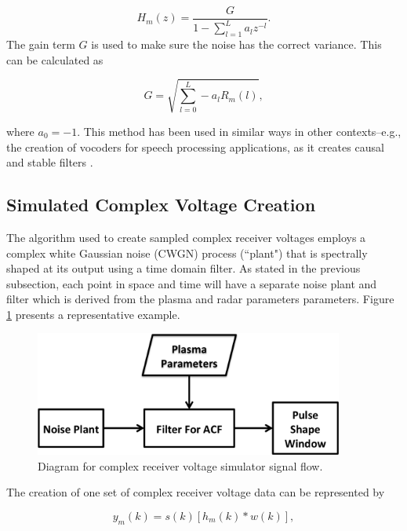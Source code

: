 \begin{equation}
\label{eq:filtz}
H_m(z) = \frac{G}{1-\displaystyle \sum_{l=1}^{L} a_l z^{-l}}.
\end{equation}
\noindent The gain term $G$ is used to make sure the noise has the correct variance. This can be calculated as 

\begin{equation}
\label{eq:gainterm}
G=\sqrt{\displaystyle \sum_{l=0}^L -a_l R_m(l)},
\end{equation}

\noindent where $a_0=-1$. This method has been used in similar ways in other contexts--e.g., the creation of vocoders for speech processing applications, as it creates causal and stable filters \cite{rabinerdigitalspeech}.

\subsection{Simulated Complex Voltage Creation}

The algorithm used to create sampled complex receiver voltages employs a complex white Gaussian noise (CWGN) process (``plant") that is spectrally shaped at its output using a time domain filter. As stated in the previous subsection, each point in space and time will have a separate noise plant and filter which is derived from the plasma and radar parameters parameters. Figure \ref{fig:IQdiagram} presents a representative example. 

\begin{figure}[h!]
\centering
\includegraphics[width=4in]{diagrampart}
\caption{Diagram for complex receiver voltage simulator signal flow.}
\label{fig:IQdiagram}
\end{figure}

The creation of one set of complex receiver voltage data can be represented by

\begin{equation}
\label{eq2}
y_m (k)= s(k)\left[h_m(k)*w(k)\right],
\end{equation}
 
